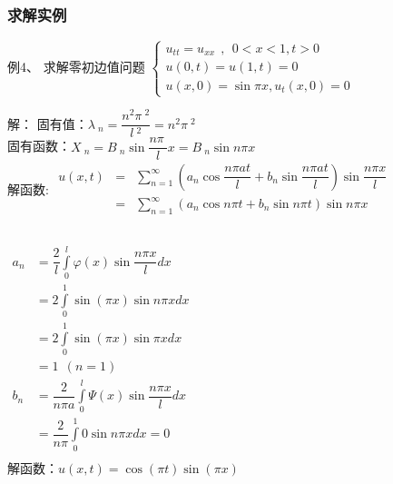 \begin{frame}
	\frametitle{求解实例}	
	\begin{exampleblock} {例4、	求解零初边值问题}
	$\displaystyle  \begin{cases}
		u_{tt} =u_{xx} ~~,~~ 0<x<1, t>0\\
		u(0,t) =u(1,t)=0 \\
		u(x,0) =\sin \pi x, u_t (x,0)=0 
	\end{cases}$ \\	
	\end{exampleblock} 	
	\alert{解：}
	固有值：$\displaystyle  \lambda~_n=\dfrac{n^2\pi~^2}{l~^2 }= n^2\pi~^2 $ \\ 
	固有函数：$\displaystyle  X~_n=B~_n \sin \dfrac{n\pi~}{l} x=B~_n \sin n\pi x $\\
	解函数:
	$\begin{array}{llll}
		u(x,t)&=& \sum\limits_{n=1}^{\infty }  (a_n\cos\dfrac{ n\pi at}{l}+ b_n\sin \dfrac{ n\pi at}{l}) \sin \dfrac{ n\pi x}{l}\\
		&= &\sum\limits_{n=1}^{\infty }  (a_n\cos n\pi t+ b_n\sin n\pi t ) \sin n\pi x \\
	\end{array}$ \\ 
\end{frame}	

\begin{frame}
	\frametitle{}	
	$\begin{array}{lllllllll}
		a_n&=  \dfrac{2}{l} \int\limits_{0 }^{l}  \varphi (x) \sin \dfrac{ n\pi x}{l} dx \\
		&= 2 \int\limits_{0 }^{1}  \sin(\pi x) \sin n\pi x dx \\
		&= 2 \int\limits_{0 }^{1}  \sin(\pi x) \sin \pi x dx  \\
		&=1~~  (n=1)   \\
		b_n&= \dfrac{2} { n\pi a} \int\limits_{0 }^{l}  \Psi  (x) \sin \dfrac{ n\pi x}{l} dx  \\
		&= \dfrac{2} { n\pi} \int\limits_{0 }^{1}  0  \sin n\pi x dx  =0\\
	\end{array}$ \\ 
	解函数：$\displaystyle  u(x,t) = \cos(\pi t) \sin(\pi x)   $\\
\end{frame}	

